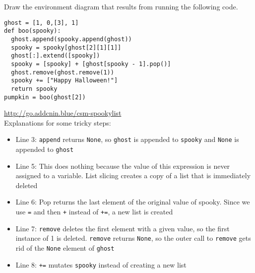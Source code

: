 \begin{blocksection}
\question Draw the environment diagram that results from running the following code.
\begin{lstlisting}
ghost = [1, 0,[3], 1]
def boo(spooky):
  ghost.append(spooky.append(ghost))
  spooky = spooky[ghost[2][1][1]]
  ghost[:].extend([spooky])
  spooky = [spooky] + [ghost[spooky - 1].pop()] 
  ghost.remove(ghost.remove(1))
  spooky += ["Happy Halloween!"]
  return spooky
pumpkin = boo(ghost[2])
\end{lstlisting}

\begin{solution}[1in]
  \url{http://go.addcnin.blue/csm-spookylist} \\
  Explanations for some tricky steps:
  \begin{itemize}
    \item Line 3: \lstinline{append} returns \lstinline{None}, so \lstinline{ghost} is appended to \lstinline{spooky} and \lstinline{None} is appended to \lstinline{ghost}
    \item Line 5: This does nothing because the value of this expression is never assigned to a variable. List slicing creates a copy of a list that is immediately deleted
    \item Line 6: Pop returns the last element of the original value of spooky. Since we use \lstinline{=} and then \lstinline{+} instead of \lstinline{+=}, a new list is created
    \item Line 7: \lstinline{remove} deletes the first element with a given value, so the first instance of 1 is deleted. \lstinline{remove} returns \lstinline{None}, so the outer call to \lstinline{remove} gets rid of the \lstinline{None} element of \lstinline{ghost}
    \item Line 8: \lstinline{+=} mutates \lstinline{spooky} instead of creating a new list 

  \end{itemize}
\end{solution}
\end{blocksection}